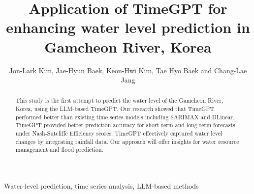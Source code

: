\documentclass[a4paper,twoside,flushend, 10pt]{article}
\begin{document}
\title{Application of TimeGPT for enhancing water level prediction in Gamcheon River, Korea}

\author{Jon-Lark Kim, Jae-Hyun Baek, Keon-Hwi Kim, Tae Hyo Baek and Chang-Lae Jang}


\begin{abstract}
This study is the first attempt to predict the water level of the Gamcheon River, Korea, using the LLM-based TimeGPT. Our research showed that TimeGPT performed better than existing time series models including SARIMAX and DLinear. TimeGPT provided better prediction accuracy for short-term and long-term forecasts under Nash-Sutcliffe Efficiency scores. TimeGPT effectively captured water level changes by integrating rainfall data. Our approach will offer insights for water resource management and flood prediction.
\end{abstract}

\begin{keyword}
Water-level prediction, time series analysis, LLM-based methods
\end{keyword}
\end{document}
